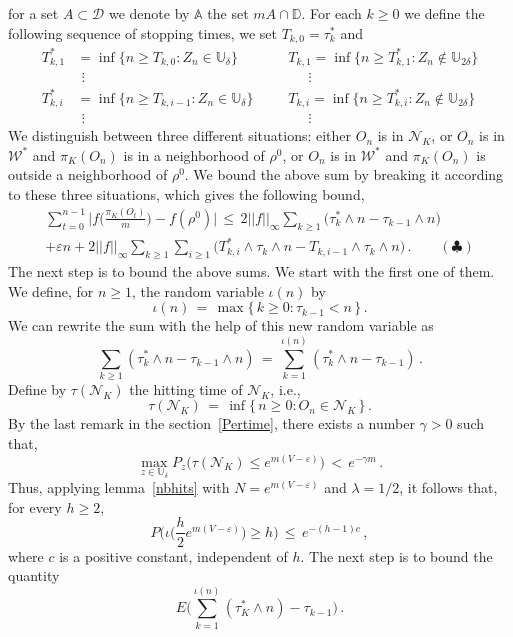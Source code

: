 \documentclass[a4paper,12pt]{article}
\theoremstyle{definition}
\theoremstyle{remark}
\def \cD {\mathcal{D}}
\def \cN {\mathcal{N}}
\def \cW {\mathcal{W}}
\def \g {\gamma}
\def \d {\delta}
\def \e {\varepsilon}
\def \l {\lambda}
\def \A {\mathbb{A}}
\def \dD {\mathbb{D}}
\def \dU {\mathbb{U}}
\def \cW {{\mathcal W}^*}
\begin{document}
for a set $A\subset \cD$ we denote by $\A$ the set $mA\cap \dD$.
For each $k\geq 0$ we define the following sequence of stopping times,
we set $T_{k,0}=\tau_k^*$ and
\begin{align*}
T^*_{k,1}&=\inf\big\lbrace
n\geq T_{k,0}:
Z_n\in\dU_\d
\big\rbrace\qquad
&&T_{k,1}=\inf\big\lbrace
n\geq T^*_{k,1}:
Z_n\not\in\dU_{2\d}
\big\rbrace\\
&\ \, \vdots &&\ \ \quad\vdots\\
T^*_{k,i}&=\inf\big\lbrace
n\geq T_{k,i-1}:
Z_n\in\dU_\d
\big\rbrace\ 
&&T_{k,i}=\inf\big\lbrace
n\geq T^*_{k,i}:
Z_n\not\in\dU_{2\d}
\big\rbrace\\
&\ \, \vdots &&\ \ \quad\vdots
\end{align*}
We distinguish between three different situations:
either $O_n$ is in $\cN_K$,
or $O_n$ is in $\cW$ and $\pi_K(O_n)$ is in a neighborhood of $\rho^0$,
or $O_n$ is in $\cW$ and $\pi_K(O_n)$ is outside a neighborhood of $\rho^0$.
We bound the above sum by breaking it according to these three situations,
which gives the following bound,
\begin{multline*}
\sum_{t=0}^{n-1}
\Bigg|
f\bigg(
\frac{\pi_K(O_t)}{m}
\bigg)-f(\rho^0)
\Bigg|\,\leq\,2||f||_\infty\sum_{k\geq 1}\big(
\tau^*_k\wedge n-\tau_{k-1}\wedge n
\big)
\\+\e n
+2||f||_\infty\sum_{k\geq 1}\sum_{i\geq 1}\big(
T^*_{k,i}\wedge \tau_k\wedge n-T_{k,i-1}\wedge\tau_k\wedge n
\big)
\,.\qquad (\clubsuit)
\end{multline*}
The next step is to bound the above sums.
We start with the first one of them.
We define, for $n\geq1$, the random variable $\iota(n)$ by 
$$\iota(n)\,=\,\max\big\lbrace\,  
k\geq0 : \tau_{k-1}< n
\,\big\rbrace\,.$$
We can rewrite the sum with the help of this new random variable as
$$\sum_{k\geq1}(\tau_k^*\wedge n-\tau_{k-1}\wedge n)\,=\,
\sum_{k=1}^{\iota(n)}(\tau_k^*\wedge n-\tau_{k-1})\,.$$
Define by $\tau(\cN_K)$ the hitting time of $\cN_K$, i.e.,
$$\tau(\cN_K)\,=\,\inf\big\lbrace\,
n\geq0 :O_n\in\cN_K
\,\big\rbrace\,.$$
By the last remark in the section~\ref{Pertime}, there exists a number $\g>0$
such that,
$$\max_{z\in\dU_\d}P_z\big(
\tau(\cN_K)\leq e^{m(V-\e)}
\big)\,<\,e^{-\g m}\,.$$
Thus, applying lemma~\ref{nbhits} with $N=e^{m(V-\e)}$ and $\l=1/2$,
it follows that, for every $h\geq 2$,
$$P\Big(
\iota\big(
\frac{h}{2}e^{m(V-\e)}
\big)\geq h
\Big)\,\leq\,e^{-(h-1)c}\,,$$
where $c$ is a positive constant, independent of $h$.
The next step is to bound the quantity 
$$E\Bigg(
\sum_{k=1}^{\iota(n)}(\tau^*_K\wedge n)-\tau_{k-1}
\Bigg)\,.$$
\end{document}
